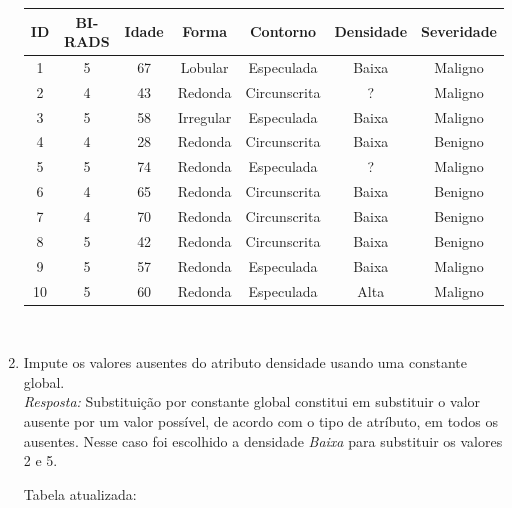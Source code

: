 \documentclass{article}
\begin{document}
\begin{enumerate}[label=\alph*]
\begin{table}[H]
  \centering
  \begin{tabular}{|c|c|c|c|c|c|c|}
  \hline
  \rowcolor[HTML]{C0C0C0} 
  ID & BI-RADS & Idade & Forma     & Contorno     & Densidade & Severidade \\ \hline
  1  & 5       & 67    & Lobular   & Especulada   & Baixa     & Maligno    \\ \hline
  2  & 4       & 43    & Redonda   & Circunscrita & ?         & Maligno    \\ \hline
  3  & 5       & 58    & Irregular & Especulada   & Baixa     & Maligno    \\ \hline
  4  & 4       & 28    & Redonda   & Circunscrita & Baixa     & Benigno    \\ \hline
  5  & 5       & 74    & Redonda   & Especulada   & ?         & Maligno    \\ \hline
  6  & 4       & 65    & Redonda   & Circunscrita & Baixa     & Benigno    \\ \hline
  7  & 4       & 70    & Redonda   & Circunscrita & Baixa     & Benigno    \\ \hline
  8  & 5       & 42    & Redonda   & Circunscrita & Baixa     & Benigno    \\ \hline
  9  & 5       & 57    & Redonda   & Especulada   & Baixa     & Maligno    \\ \hline
  10 & 5       & 60    & Redonda   & Especulada   & Alta      & Maligno    \\ \hline
  \end{tabular} \\
  \end{table}

  \item Impute os valores ausentes do atributo densidade usando uma constante global. \\
  \textit{Resposta:} Substituição por constante global constitui em substituir o valor ausente por um valor possível, de acordo com o tipo de atríbuto, em todos os ausentes.
  Nesse caso foi escolhido a densidade \textit{Baixa} para substituir os valores 2 e 5.

  Tabela atualizada:


\end{enumerate}
\end{document}
